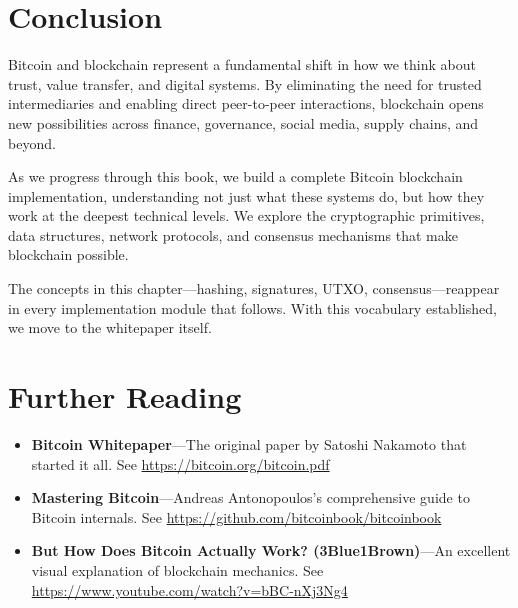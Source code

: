 \section{Conclusion}
\label{sec:ch02-conclusion}

Bitcoin and blockchain represent a fundamental shift in how we think about trust, value transfer, and digital systems. By eliminating the need for trusted intermediaries and enabling direct peer-to-peer interactions, blockchain opens new possibilities across finance, governance, social media, supply chains, and beyond.

As we progress through this book, we build a complete Bitcoin blockchain implementation, understanding not just what these systems do, but how they work at the deepest technical levels. We explore the cryptographic primitives, data structures, network protocols, and consensus mechanisms that make blockchain possible.

The concepts in this chapter---hashing, signatures, UTXO, consensus---reappear in every implementation module that follows. With this vocabulary established, we move to the whitepaper itself.

\section{Further Reading}
\label{sec:ch02-further-reading}

\begin{itemize}
  \item \textbf{Bitcoin Whitepaper}---The original paper by Satoshi Nakamoto that started it all. See \url{https://bitcoin.org/bitcoin.pdf}
  \item \textbf{Mastering Bitcoin}---Andreas Antonopoulos's comprehensive guide to Bitcoin internals. See \url{https://github.com/bitcoinbook/bitcoinbook}
  \item \textbf{But How Does Bitcoin Actually Work? (3Blue1Brown)}---An excellent visual explanation of blockchain mechanics. See \url{https://www.youtube.com/watch?v=bBC-nXj3Ng4}
\end{itemize}

